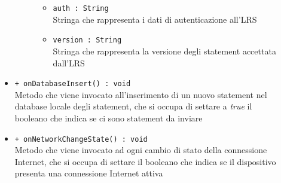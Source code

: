 \documentclass[../Tesi.tex]{subfiles}
\begin{document}
\begin{description}
\begin{itemize}
\begin{description}
\begin{itemize}
						\item \texttt{auth : String}\\
						Stringa che rappresenta i dati di autenticazione all'LRS

						\item \texttt{version : String}\\
						Stringa che rappresenta la versione degli statement accettata dall'LRS
					\end{itemize}
				\end{description}

				\item \texttt{+ onDatabaseInsert() : void}\\
				Metodo che viene invocato all'inserimento di un nuovo statement nel database locale degli statement, che si occupa di settare a \textit{true} il booleano che indica se ci sono statement da inviare

				\item \texttt{+ onNetworkChangeState() : void}\\
				Metodo che viene invocato ad ogni cambio di stato della connessione Internet, che si occupa di settare il booleano che indica se il dispositivo presenta una connessione Internet attiva

			\end{itemize}
		\end{description}
\end{document}
